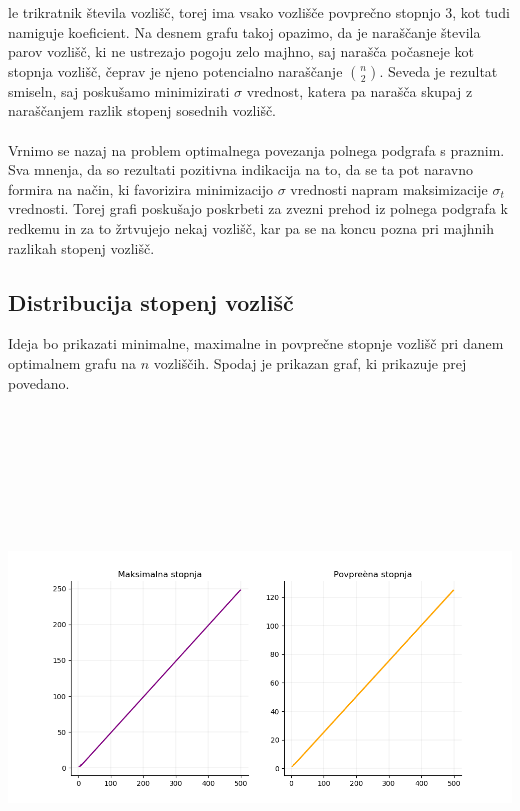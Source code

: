 \documentclass[ letterpaper, titlepage, fleqn]{article}
\begin{document}
le trikratnik števila vozlišč, torej ima vsako vozlišče povprečno stopnjo $3$, kot tudi namiguje koeficient.
Na desnem grafu takoj opazimo, da je naraščanje števila parov vozlišč, ki ne ustrezajo pogoju
zelo majhno, saj narašča počasneje kot stopnja vozlišč, čeprav je njeno potencialno naraščanje
$\binom{n}{2}$. 
Seveda je rezultat smiseln, saj poskušamo minimizirati $\sigma$ vrednost, katera pa narašča
skupaj z naraščanjem razlik stopenj sosednih vozlišč. 
\\\\
Vrnimo se nazaj na problem optimalnega povezanja polnega podgrafa s praznim. 
Sva mnenja, da so rezultati pozitivna indikacija na to, da se ta pot naravno formira na način, 
ki favorizira minimizacijo $\sigma$ vrednosti napram maksimizacije $\sigma_t$ vrednosti.
Torej grafi poskušajo poskrbeti za zvezni prehod iz polnega podgrafa k redkemu in za to 
žrtvujejo nekaj vozlišč, kar pa se na koncu pozna pri majhnih razlikah stopenj vozlišč.

\subsection{Distribucija stopenj vozlišč}
Ideja bo prikazati minimalne, maximalne in povprečne stopnje vozlišč pri danem optimalnem grafu na $n$ vozliščih.
Spodaj je prikazan graf, ki prikazuje prej povedano. \\
\includegraphics[width=\textwidth, height=15cm]{graphics/degree_distribution.png}\\
\end{document}
